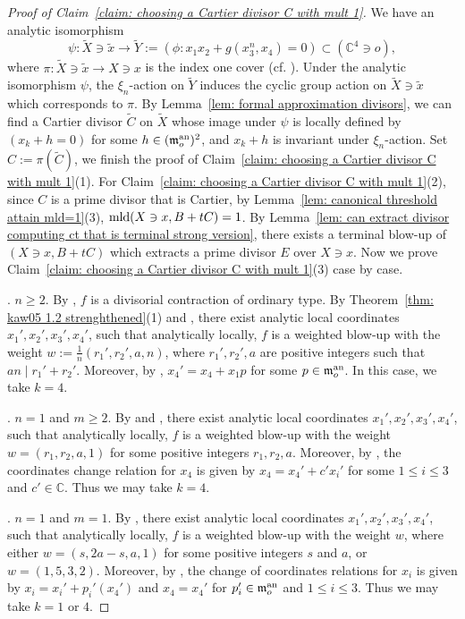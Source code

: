 \documentclass[11pt]{amsart}
\numberwithin{equation}{section}
\newcommand{\Cc}{\mathbb{C}}
\newcommand{\mld}{{\rm{mld}}}
\newcommand{\fm}{\mathfrak{m}}
\theoremstyle{definition}
\theoremstyle{definition}
\begin{document}
\begin{proof}[Proof of Claim~\ref{claim: choosing a Cartier divisor C with mult 1}]
We have an analytic isomorphism $$\psi: \tilde{X}\ni \tilde{x}\to \tilde{Y}:=(\phi: x_1x_2+g(x_3^n,x_4)=0)\subset (\mathbb C^4\ni o),$$ where $\pi:\tilde{X}\ni \tilde{x} \to X\ni x$ is the index one cover (cf. \cite[Definition~5.19]{KM98}). Under the analytic isomorphism $\psi$, the $\xi_n$-action on $\tilde{Y}$ induces the cyclic group action on $\tilde{X}\ni \tilde{x}$ which corresponds to $\pi$. By Lemma~\ref{lem: formal approximation divisors}, we can find a Cartier divisor $\tilde{C}$ on $\tilde{X}$ whose image under $\psi$ is locally defined by $(x_k+h=0)$ for some $h\in (\fm_o^{\rm an})^2$, and $x_k+h$ is invariant under $\xi_n$-action. Set $C:=\pi(\tilde{C})$, we finish the proof of Claim~\ref{claim: choosing a Cartier divisor C with mult 1}(1). For Claim~\ref{claim: choosing a Cartier divisor C with mult 1}(2), since $C$ is a prime divisor that is Cartier, by Lemma~\ref{lem: canonical threshold attain mld=1}(3), $\mld(X\ni x, B+tC)=1$. By Lemma~\ref{lem: can extract divisor computing ct that is terminal strong version}, there exists a terminal blow-up of $(X\ni x, B+tC)$ which extracts a prime divisor $E$ over $X\ni x$. Now we prove Claim~\ref{claim: choosing a Cartier divisor C with mult 1}(3) case by case. 

\medskip

. $n\geq 2$. By \cite[Theorem~1.3]{Kaw05}, $f$ is a divisorial contraction of ordinary type. By Theorem~\ref{thm: kaw05 1.2 strenghthened}(1) and \cite[Lemmas~6.1,~6.2~and~6.5]{Kaw05}, there exist analytic local coordinates $x_1',x_2',x_3',x_4'$, such that analytically locally, $f$ is a weighted blow-up with the weight $w:=\frac{1}{n}(r_1',r_2',a,n)$, where $r_1',r_2',a$ are positive integers such that $an\mid r_1'+r_2'$. Moreover, by \cite[Proof of Lemma 6.3, Line 7]{Kaw05}, $x_4'=x_4+x_1p$ for some $p\in \mathfrak{m}_o^{\rm an}$. In this case, we take $k=4$.

\medskip

. $n=1$ and $m\geq 2$. By \cite[Theorem~1.13]{Kaw03} and \cite[Theorem~2.6]{Yam18}, there exist analytic local coordinates $x_1',x_2',x_3',x_4'$, such that analytically locally, $f$ is a weighted blow-up with the weight $w=(r_1,r_2,a,1)$ for some positive integers $r_1,r_2,a$. Moreover, by \cite[Proof of Lemma 6.1, Page 309, Line 5]{Kaw03}, the coordinates change relation for $x_4$ is given by $x_4=x_4'+c'x_i'$ for some $1\leq i\leq 3$ and $c'\in \Cc$. Thus we may take $k=4$.

\medskip

. $n=1$ and $m=1$. By \cite[Theorem~1.1]{Kaw02}, there exist analytic local coordinates $x_1',x_2',x_3',x_4'$, such that analytically locally, $f$ is a weighted blow-up with the weight $w$, where either $w=(s,2a-s,a,1)$ for some positive integers $s$ and $a$, or $w=(1,5,3,2)$. Moreover, by \cite[Claim 6.13]{Kaw02}, the change of coordinates relations for $x_i$ is given by $x_i=x_i'+p_i'(x_4')$ and $x_4=x_4'$ for $p_i'\in {\fm}_o^{\rm an}$ and $1\leq i\leq 3$. Thus we may take $k=1$ or $4$.
\end{proof}
\end{document}
